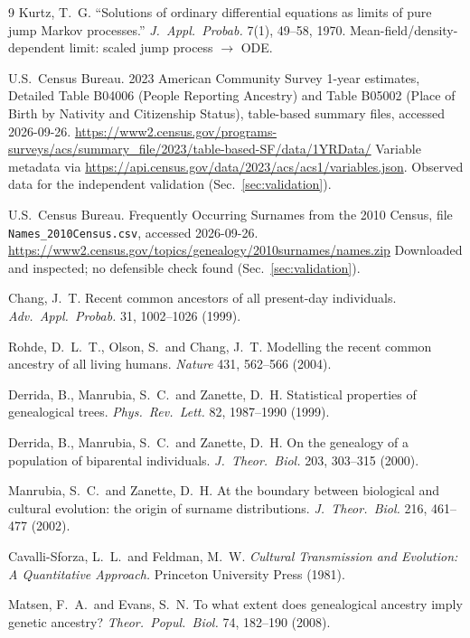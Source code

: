 \documentclass[11pt,a4paper]{article}
\begin{document}
{\begin{thebibliography}{9}
Kurtz, T.~G. ``Solutions of ordinary differential equations as limits
of pure jump Markov processes.'' \textit{J.\ Appl.\ Probab.} 7(1),
49--58, 1970.  Mean-field/density-dependent limit: scaled jump process
$\to$ ODE.

U.S.\ Census Bureau. 2023 American Community Survey 1-year estimates,
Detailed Table B04006 (People Reporting Ancestry) and Table B05002
(Place of Birth by Nativity and Citizenship Status), table-based
summary files, accessed 2026-09-26.
\url{https://www2.census.gov/programs-surveys/acs/summary_file/2023/table-based-SF/data/1YRData/}
Variable metadata via
\url{https://api.census.gov/data/2023/acs/acs1/variables.json}.
Observed data for the independent validation (Sec.~\ref{sec:validation}).

U.S.\ Census Bureau. Frequently Occurring Surnames from the 2010
Census, file \texttt{Names\_2010Census.csv}, accessed 2026-09-26.
\url{https://www2.census.gov/topics/genealogy/2010surnames/names.zip}
Downloaded and inspected; no defensible check found
(Sec.~\ref{sec:validation}).

Chang, J.~T. Recent common ancestors of all present-day individuals.
\textit{Adv.\ Appl.\ Probab.} 31, 1002--1026 (1999).

Rohde, D.~L.~T., Olson, S.\ and Chang, J.~T. Modelling the recent common
ancestry of all living humans. \textit{Nature} 431, 562--566 (2004).

Derrida, B., Manrubia, S.~C.\ and Zanette, D.~H. Statistical properties of
genealogical trees. \textit{Phys.\ Rev.\ Lett.} 82, 1987--1990 (1999).

Derrida, B., Manrubia, S.~C.\ and Zanette, D.~H. On the genealogy of a
population of biparental individuals. \textit{J.\ Theor.\ Biol.} 203,
303--315 (2000).

Manrubia, S.~C.\ and Zanette, D.~H. At the boundary between biological and
cultural evolution: the origin of surname distributions. \textit{J.\
Theor.\ Biol.} 216, 461--477 (2002).

Cavalli-Sforza, L.~L.\ and Feldman, M.~W. \textit{Cultural Transmission and
Evolution: A Quantitative Approach.} Princeton University Press (1981).

Matsen, F.~A.\ and Evans, S.~N. To what extent does genealogical ancestry
imply genetic ancestry? \textit{Theor.\ Popul.\ Biol.} 74, 182--190 (2008).

\end{thebibliography}
}
\end{document}
